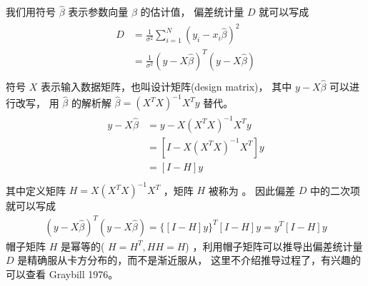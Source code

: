 \documentclass[letterpaper,10pt,english]{sphinxmanual}
\begin{document}
我们用符号 \(\hat{\beta}\) 表示参数向量 \(\beta\) 的估计值，
偏差统计量 \(D\) 就可以写成
\begin{align}\label{equation:高斯模型/content:高斯模型/content:21}\!\begin{aligned}
D &= \frac{1}{\sigma^2} \sum_{i=1}^N   (y_i- x_i\hat{\beta}  )^2\\
&= \frac{1}{\sigma^2} (y - X \hat{\beta} )^T  (y - X\hat{\beta})\\
\end{aligned}\end{align}
符号 \(X\) 表示输入数据矩阵，也叫设计矩阵(design matrix)，
其中 \(y - X \hat{\beta}\) 可以进行改写，
用 \(\hat{\beta}\) 的解析解 \(\hat{\beta}=(X^TX)^{-1}X^Ty\) 替代。
\begin{align}\label{equation:高斯模型/content:高斯模型/content:22}\!\begin{aligned}
y - X \hat{\beta} &= y - X(X^TX)^{-1}X^Ty\\
&= [ I - X(X^TX)^{-1} X^T  ]y\\
&= [ I - H]y\\
\end{aligned}\end{align}
其中定义矩阵 \(H=X(X^TX)^{-1} X^T\)
，矩阵 \(H\) 被称为 。
因此偏差 \(D\) 中的二次项就可以写成
\begin{equation}\label{equation:高斯模型/content:高斯模型/content:23}
\begin{split}(y - X \hat{\beta} )^T  (y - X\hat{\beta}) =
\{[ I - H]y \}^T [ I - H]y
= y^T[I-H]y\end{split}
\end{equation}
帽子矩阵 \(H\) 是幂等的( \(H=H^T,HH=H\))
，利用帽子矩阵可以推导出偏差统计量 \(D\) 是精确服从卡方分布的，而不是渐近服从，
这里不介绍推导过程了，有兴趣的可以查看 Graybill 1976。
\end{document}
